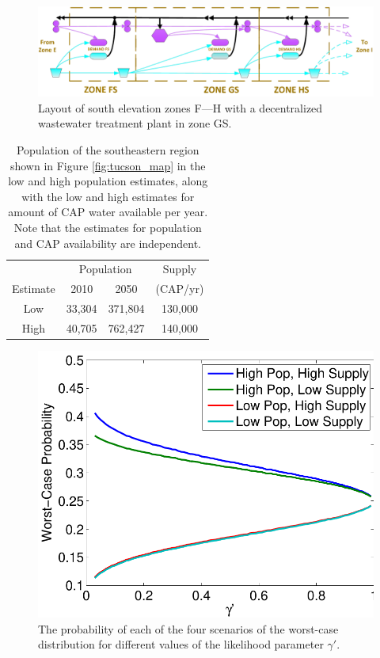 \documentclass[12pt]{amsart}
\begin{document}
\begin{figure}[!ht]
	\centering
	\includegraphics[width=.8\textwidth]{images/zones_south}
	\caption{
		Layout of south elevation zones F---H with a decentralized wastewater treatment plant in zone GS.
	}
	\label{fig:zones_wwtp}
\end{figure}


\begin{table}[~ht]
	\centering
	\begin{tabular}{|c|cc||c|}
		\hline
		& \multicolumn{2}{|c||}{Population} & Supply \\
		Estimate & 2010 & 2050 & (CAP/yr) \\
		\hline
		\hline
		Low  & 33,304 & 371,804 & 130,000 \\
		\hline
		High & 40,705 & 762,427 & 140,000 \\
		\hline
	\end{tabular}
	\caption{
		Population of the southeastern region shown in Figure \ref{fig:tucson_map} in the low and high population estimates, along with the low and high estimates for amount of CAP water available per year.
		Note that the estimates for population and CAP availability are independent.
	}
	\label{tab:scenario_description}
\end{table}

\begin{figure}[!ht]
	\centering
	\includegraphics[width=.7\textwidth]{images/worst_case_probability}
	\caption{
		The probability of each of the four scenarios of the worst-case distribution for different values of the likelihood parameter $\gamma'$.
	}
	\label{fig:worst_case}
\end{figure}
\end{document}
